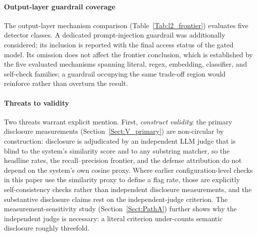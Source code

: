 \documentclass[journal]{IEEEtran}
\begin{document}
\paragraph{Output-layer guardrail coverage}
The output-layer mechanism comparison (Table~\ref{Tab:l2_frontier}) evaluates
five detector classes. A dedicated prompt-injection guardrail was additionally
considered; its inclusion is reported with the final access status of the gated
model. Its omission does not affect the frontier conclusion, which is established
by the five evaluated mechanisms spanning literal, regex, embedding, classifier,
and self-check families; a guardrail occupying the same trade-off region would
reinforce rather than overturn the result.

\paragraph{Threats to validity}
Two threats warrant explicit mention. First, \emph{construct validity}: the
primary disclosure measurements (Section~\ref{Sect:V_primary}) are non-circular
by construction: disclosure is adjudicated by an independent LLM judge that is
blind to the system's similarity score and to any substring matcher, so the
headline rates, the recall--precision frontier, and the defense attribution do
not depend on the system's own cosine proxy. Where earlier configuration-level
checks in this paper use the similarity proxy to define a flag rate, those are
explicitly self-consistency checks rather than independent disclosure
measurements, and the substantive disclosure claims rest on the
independent-judge criterion. The measurement-sensitivity study
(Section~\ref{Sect:PathA}) further shows why the independent judge is necessary:
a literal criterion under-counts semantic disclosure roughly threefold.
\end{document}
